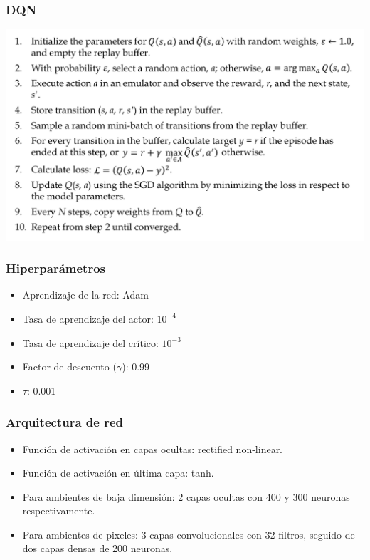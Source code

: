 \documentclass[
    11pt,
    aspectratio=169,
]{beamer}
\begin{document}
\begin{frame}
\frametitle{DQN}

\begin{center}
\includegraphics[scale=0.25]{Images/dqn}
\end{center}

\end{frame}

\begin{frame}
\frametitle{Hiperparámetros}

\begin{itemize}
\item Aprendizaje de la red: Adam
\item Tasa de aprendizaje del actor: $10^{-4}$
\item Tasa de aprendizaje del crítico: $10^{-3}$
\item Factor de descuento ($\gamma$): 0.99
\item $\tau$: 0.001
\end{itemize}

\end{frame}

\begin{frame}
\frametitle{Arquitectura de red}

\begin{itemize}
\item Función de activación en capas ocultas: rectified non-linear.
\item Función de activación en última capa: tanh.
\item Para ambientes de baja dimensión: 2 capas ocultas con 400 y 300 neuronas respectivamente.
\item Para ambientes de pixeles: 3 capas convolucionales con 32 filtros, seguido de dos capas densas de 200 neuronas.
\end{itemize}

\end{frame}
\end{document}
